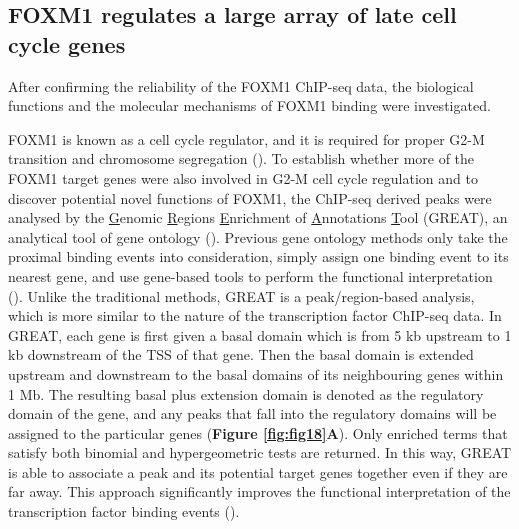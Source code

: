 \pagebreak

\subsection{FOXM1 regulates a large array of late cell cycle genes}

After confirming the reliability of the FOXM1 ChIP-seq data, the biological functions and the molecular mechanisms of FOXM1 binding were investigated.

FOXM1 is known as a cell cycle regulator, and it is required for proper G2-M transition and chromosome segregation (\cite{laoukili2005foxm1,wang2005forkhead}). To establish whether more of the FOXM1 target genes were also involved in G2-M cell cycle regulation and to discover potential novel functions of FOXM1, the ChIP-seq derived peaks were analysed by the \underline{G}enomic \underline{R}egions \underline{E}nrichment of \underline{A}nnotations \underline{T}ool (GREAT), an analytical tool of gene ontology (\cite{mclean2010great}). Previous gene ontology methods only take the proximal binding events into consideration, simply assign one binding event to its nearest gene, and use gene-based tools to perform the functional interpretation (\cite{huang2009bioinformatics}). Unlike the traditional methods, GREAT is a peak/region-based analysis, which is more similar to the nature of the transcription factor ChIP-seq data. In GREAT, each gene is first given a basal domain which is from 5 kb upstream to 1 kb downstream of the TSS of that gene. Then the basal domain is extended upstream and downstream to the basal domains of its neighbouring genes within 1 Mb. The resulting basal plus extension domain is denoted as the regulatory domain of the gene, and any peaks that fall into the regulatory domains will be assigned to the particular genes (\textbf{Figure \ref{fig:fig18}A}). Only enriched terms that satisfy both binomial and hypergeometric tests are returned. In this way, GREAT is able to associate a peak and its potential target genes together even if they are far away. This approach significantly improves the functional interpretation of the transcription factor binding events (\cite{mclean2010great}).

